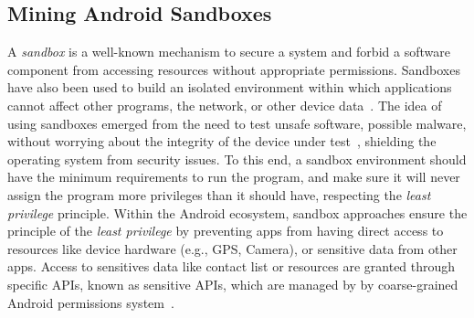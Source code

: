 \subsection{Mining Android Sandboxes}\label{sec:android-sandbox}

A \emph{sandbox}
is a well-known mechanism to secure a system and forbid a software component from accessing
resources without appropriate permissions. Sandboxes have also been used to build an isolated
environment within which applications cannot affect other programs, the network, or other device
data~\cite{DBLP:journals/peerj-cs/MaassSCS16}. The idea of using sandboxes emerged from the
need to test unsafe software, possible malware, without worrying about the integrity of the
device under test~\cite{DBLP:conf/esorics/BordoniCS17}, shielding the operating system from security issues.
To this end, a sandbox environment should have the minimum requirements to run the
program, and make sure it will never assign the program more privileges than it should have,
respecting the \emph{least privilege} principle.
Within the Android ecosystem, sandbox approaches ensure the principle
of the \emph{least privilege} by preventing apps from having direct access to resources like device hardware (e.g., GPS, Camera), or sensitive data from other apps. Access to sensitives data
like contact list or resources are granted through specific APIs, known as sensitive APIs, which are managed by by coarse-grained Android permissions system~\cite{DBLP:journals/corr/abs-2109-06613}.




